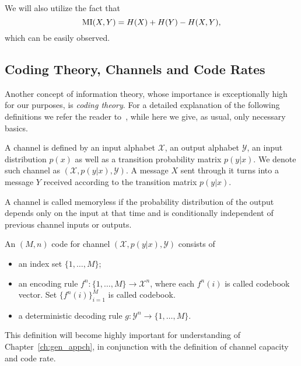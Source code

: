 We will also utilize the fact that
\begin{equation}\label{eq:background_mi_decomposition}
  \mathrm{MI}(X, Y) = H(X) + H(Y) - H(X, Y),
\end{equation}
which can be easily observed.


\subsection{Coding Theory, Channels and Code Rates}
\label{sec:background_coding}
Another concept of information theory, whose importance is exceptionally high
for our purposes, is \textit{coding theory}.  For a
detailed explanation of the following definitions we refer the reader to~\citep[Chapter 7]{Cover:2006}, while
here we give, as usual, only necessary basics.

\begin{definition}[Channel] \label{def:discrete_coding_channel}
  A channel is defined by an input alphabet $\mathcal{X}$, an output alphabet
  $\mathcal{Y}$, an input distribution $p(x)$ as well as a transition probability
  matrix $p(y|x)$. We denote such channel as $(\mathcal{X}, p(y|x),
  \mathcal{Y})$. A message $X$ sent through it turns into a message $Y$ received
  according to the transition matrix $p(y|x)$.
\end{definition}
%
%

\begin{definition}
  A channel is called memoryless if the probability distribution of the output 
  depends only on the input at that time and is conditionally independent of 
  previous channel inputs or outputs.
\end{definition}

\begin{definition}[Code] \label{def:discrete_code}
  An $(M, n)$ code for channel $(\mathcal{X}, p(y \vert x), \mathcal{Y})$ consists of
  \begin{itemize}
    \item an index set $\{1, \ldots, M\}$;
    \item an encoding rule $f^n \colon \{1, \ldots, M\} \to \mathcal{X}^n$, where 
      each $f^n(i)$ is called codebook vector. Set $\{ f^n(i)\}_{i=1}^M$ is called
      codebook.
    \item a deterministic decoding rule $g \colon \mathcal{Y}^n \to \{1, \ldots,
    M\}$.
  \end{itemize}
\end{definition}
This definition will become highly important for understanding of Chapter~\ref{ch:gen_appch},
in conjunction with the definition of channel capacity and code rate.

